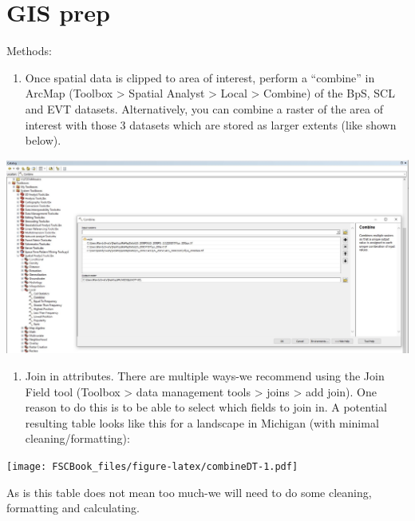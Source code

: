 \documentclass[
]{book}
\providecommand{\tightlist}{%
  \setlength{\itemsep}{0pt}\setlength{\parskip}{0pt}}
\begin{document}
\hypertarget{gisPrep}{%
\chapter{GIS prep}\label{gisPrep}}

Methods:

\begin{enumerate}
\def\labelenumi{\arabic{enumi}.}
\tightlist
\item
  Once spatial data is clipped to area of interest, perform a ``combine'' in ArcMap (Toolbox \textgreater{} Spatial Analyst \textgreater{} Local \textgreater{} Combine) of the BpS, SCL and EVT datasets. Alternatively, you can combine a raster of the area of interest with those 3 datasets which are stored as larger extents (like shown below).
\end{enumerate}

\includegraphics[width=1\linewidth]{combine}

\begin{enumerate}
\def\labelenumi{\arabic{enumi}.}
\setcounter{enumi}{1}
\tightlist
\item
  Join in attributes. There are multiple ways-we recommend using the Join Field tool (Toolbox \textgreater{} data management tools \textgreater{} joins \textgreater{} add join). One reason to do this is to be able to select which fields to join in. A potential resulting table looks like this for a landscape in Michigan (with minimal cleaning/formatting):
\end{enumerate}

\texttt{[image: FSCBook\_files/figure-latex/combineDT-1.pdf]}

As is this table does not mean too much-we will need to do some cleaning, formatting and calculating.
\end{document}

